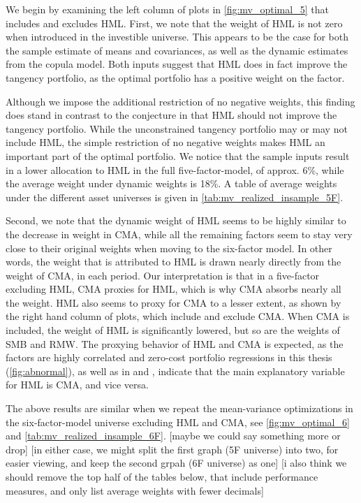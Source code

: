 We begin by examining the left column of plots in \autoref{fig:mv_optimal_5} that includes and excludes HML. First, we note that the weight of HML is not zero when introduced in the investible universe. This appears to be the case for both the sample estimate of means and covariances, as well as the dynamic estimates from the copula model. Both inputs suggest that HML does in fact improve the tangency portfolio, as the optimal portfolio has a positive weight on the factor. 

Although we impose the additional restriction of no negative weights, this finding does stand in contrast to the conjecture in \textcite{FF2015} that HML should not improve the tangency portfolio. While the unconstrained tangency portfolio may or may not include HML, the simple restriction of no negative weights makes HML an important part of the optimal portfolio. We notice that the sample inputs result in a lower allocation to HML in the full five-factor-model, of approx. 6\%, while the average weight under dynamic weights is 18\%. A table of average weights under the different asset universes is given in \autoref{tab:mv_realized_insample_5F}.

Second, we note that the dynamic weight of HML seems to be highly similar to the decrease in weight in CMA, while all the remaining factors seem to stay very close to their original weights when moving to the six-factor model. In other words, the weight that is attributed to HML is drawn nearly directly from the weight of CMA, in each period. Our interpretation is that in a five-factor excluding HML, CMA proxies for HML, which is why CMA absorbs nearly all the weight. HML also seems to proxy for CMA to a lesser extent, as shown by the right hand column of plots, which include and exclude CMA. When CMA is included, the weight of HML is significantly lowered, but so are the weights of SMB and RMW. The proxying behavior of HML and CMA is expected, as the factors are highly correlated and zero-cost portfolio regressions in this thesis (\autoref{fig:abnormal}), as well as in \textcite{FF2015} and \textcite{Asness2015}, indicate that the main explanatory variable for HML is CMA, and vice versa.

The above results are similar when we repeat the mean-variance optimizations in the six-factor-model universe excluding HML and CMA, see \autoref{fig:mv_optimal_6} and \autoref{tab:mv_realized_insample_6F}. [maybe we could say something more or drop] [in either case, we might split the first graph (5F universe) into two, for easier viewing, and keep the second grpah (6F universe) as one] [i also think we should remove the top half of the tables below, that include performance measures, and only list average weights with fewer decimals]

